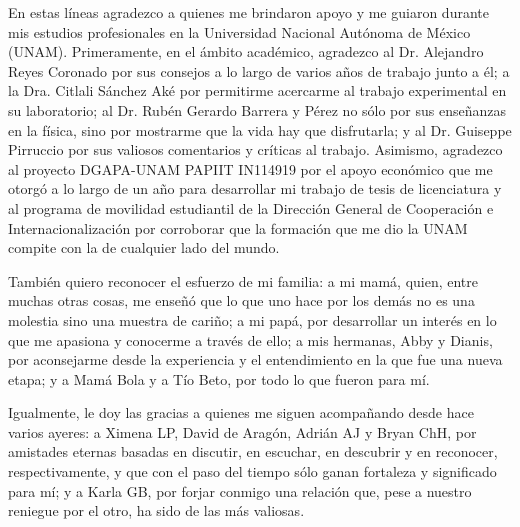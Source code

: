 \begin{acknowledgements}
\small

En estas líneas agradezco a quienes me brindaron apoyo y me guiaron durante mis estudios profesionales en la Universidad Nacional Autónoma de México (UNAM). Primeramente, en el ámbito académico, agradezco al Dr. Alejandro Reyes Coronado por sus consejos a lo largo de varios años de trabajo junto a él; a la Dra. Citlali Sánchez Aké por permitirme acercarme al trabajo experimental en su laboratorio; al Dr. Rubén Gerardo Barrera y Pérez no sólo por sus enseñanzas en la física, sino por mostrarme que la vida hay que disfrutarla; y al Dr. Guiseppe Pirruccio por sus valiosos comentarios y críticas al trabajo. Asimismo, agradezco al proyecto  DGAPA-UNAM PAPIIT IN114919 por el apoyo económico que me otorgó a lo largo de un año para desarrollar mi trabajo de tesis de licenciatura y al programa de movilidad estudiantil de la Dirección General de Cooperación e Internacionalización por corroborar que la formación que me dio la UNAM compite con la de cualquier lado del mundo.

También quiero reconocer el esfuerzo de mi familia: a mi mamá, quien, entre muchas otras cosas, me enseñó que lo que uno hace por los demás no es una molestia sino una muestra de cariño; a mi papá, por desarrollar un interés en lo que me apasiona y conocerme a través de ello; a mis hermanas, Abby y Dianis, por aconsejarme desde la experiencia y el entendimiento en la que fue una nueva etapa; y a Mamá Bola y a Tío Beto, por todo lo que fueron para mí.

Igualmente, le doy las gracias a quienes me siguen acompañando desde hace varios ayeres: a Ximena LP, David de Aragón, Adrián AJ y Bryan ChH, por amistades eternas basadas en discutir, en escuchar, en descubrir y en reconocer, respectivamente, y que con el paso del tiempo sólo ganan fortaleza y significado para mí; y a Karla GB, por forjar conmigo una relación que, pese a nuestro reniegue por el otro, ha sido de las más valiosas.


\end{acknowledgements}
